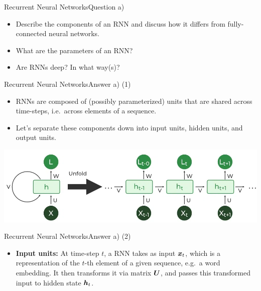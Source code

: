 \documentclass[t]{beamer}
\begin{document}
\begin{frame}{Recurrent Neural Networks}{Question a)}
    \begin{itemize}
        \item Describe the components of an RNN and discuss how it differs from
              fully-connected neural networks.
        \item What are the parameters of an RNN?
        \item Are RNNs deep? In what way(s)?
    \end{itemize}
\end{frame}

\begin{frame}{Recurrent Neural Networks}{Answer a) (1)}
    \begin{itemize}
        \item RNNs are composed of (possibly parameterized) units that are
              shared across time-steps, i.e.\ across elements of a sequence.
        \item Let's separate these components down into input units, hidden
              units, and output units.
    \end{itemize}
    \vspace{0.5cm}
    \begin{center}
        \includegraphics[scale=0.3]{img/rnn_2.png}
    \end{center}
\end{frame}

\begin{frame}{Recurrent Neural Networks}{Answer a) (2)}
    \begin{itemize}
        \item \textbf{Input units:} At time-step $t$, a RNN takes as input
              ${\boldsymbol{x}}_t$, which is a representation of the $t$-th element of a
              given sequence, e.g.\ a word embedding.
              It then transforms it via matrix ${\boldsymbol{U}}$, and passes this
              transformed input to hidden state ${\boldsymbol{h}}_t$.
    \end{itemize}
\end{frame}
\end{document}
